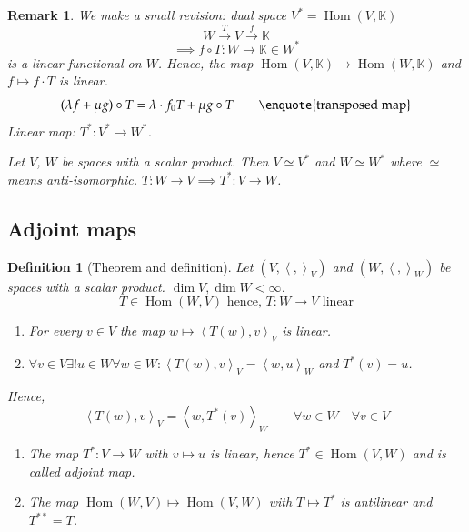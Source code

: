 \documentclass{article}
\newcounter{lecref}[section]
\numberwithin{lecref}{section}
\newtheorem{definition}[lecref]{Definition}
\newtheorem{remark}[lecref]{Remark}
\newcommand{\ip}[2]{\left\langle#1,#2\right\rangle} %
\begin{document}
\begin{remark}
  We make a small revision: dual space $V^* = \operatorname{Hom}(V, \mathbb K)$
  \[ W \xrightarrow{T} V \xrightarrow{f} \mathbb K \]
  \[ \implies f \circ T: W \to \mathbb K \in W^* \]
  is a linear functional on $W$.
  Hence, the map $\operatorname{Hom}(V, \mathbb K) \to \operatorname{Hom}(W, \mathbb K)$ and $f \mapsto f \cdot T$ is linear.
  \[ (\lambda f + \mu g) \circ T = \lambda \cdot f_0 T + \mu g \circ T \qquad \text{\enquote{transposed map}} \]
  Linear map: $T^*: V^* \to W^*$.

  Let $V$, $W$ be spaces with a scalar product. Then $V \simeq V^*$ and $W \simeq W^*$ where $\simeq$ means anti-isomorphic.
  $T: W \to V \implies T^*: V \to W$.
\end{remark}

\subsection{Adjoint maps}
\begin{definition}[Theorem and definition] %
  \label{def863}
  Let $(V, \ip{}{}_V)$ and $(W, \ip{}{}_W)$ be spaces with a scalar product. $\dim{V}, \dim{W} < \infty$.
  \[ T \in \operatorname{Hom}(W, V) \text{ hence, } T: W \to V \text{ linear} \]
  \begin{enumerate}
    \item For every $v \in V$ the map $w \mapsto \ip{T(w)}{v}_V$ is linear.
    \item $\forall v \in V \exists! u \in W \forall w \in W: \ip{T(w)}{v}_V = \ip{w}{u}_W$ and $T^*(v) = u$.
  \end{enumerate}
  Hence,
  \[ \ip{T(w)}{v}_V = \ip{w}{T^*(v)}_W \qquad \forall w \in W \quad \forall v \in V \]
  \begin{enumerate}
    \item[3.] The map $T^*: V \to W$ with $v \mapsto u$ is linear, hence $T^* \in \operatorname{Hom}(V, W)$ and is called \emph{adjoint map}.
    \item[4.] The map $\operatorname{Hom}(W, V) \mapsto \operatorname{Hom}(V, W)$ with $T \mapsto T^*$ is antilinear and $T^{**} = T$.
  \end{enumerate}
\end{definition}
\end{document}
